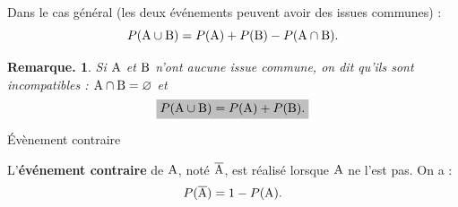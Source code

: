 \documentclass[12pt]{article}
\theoremstyle{break}
\newtheorem*{remark}{Remarque.}
\begin{document}
\begin{center}
\end{center}

\begin{proposition}{}{}
  \begin{multihide}
  Dans le cas général (les deux événements peuvent avoir des issues communes) :
  \[
  P(\mathrm{A}\cup \mathrm{B}) = P(\mathrm{A}) + P(\mathrm{B}) - P(\mathrm{A}\cap \mathrm{B}).
  \]
  \end{multihide}
\end{proposition}

\begin{remark}
Si $\mathrm{A}$ et $\mathrm{B}$ n'ont aucune issue commune, on dit qu'ils sont \emph{incompatibles} : $\mathrm{A}\cap \mathrm{B}=\varnothing$ et
\[
\hideM{P(\A\cup \B) = P(\A)+P(\B).}
\]
\end{remark}
 
\begin{minipage}{0.6\linewidth}
\begin{definition}{Évènement contraire}{}
  \begin{multihide}
  L'\textbf{événement contraire} de $\mathrm{A}$, noté $\overline{\mathrm{A}}$, est réalisé lorsque $\mathrm{A}$ ne l'est pas. On a :
  \[
  P(\overline{\mathrm{A}}) = 1 - P(\mathrm{A}).
  \]
  \end{multihide}
\end{definition}
\end{minipage}
\hfill
\begin{minipage}{0.37\linewidth}

\begin{center}
\end{center}
  
\end{minipage}
 
\end{document}
